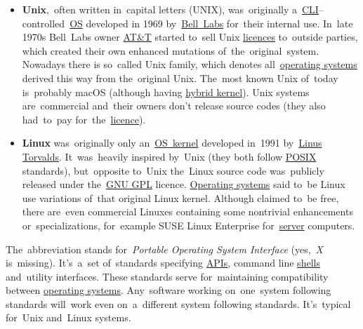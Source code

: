 \label{linux}

\label{unixlinux}
\begin{itemize}
    \item \textbf{Unix},~often written in~capital letters (UNIX), was~originally a~\hyperref[shellcligui]{CLI}--controlled~\hyperref[os]{OS} developed in 1969 by~\href{https://en.wikipedia.org/wiki/Bell_Labs}{Bell~Labs} for~their internal use.
          In~late 1970s Bell~Labs owner \href{https://en.wikipedia.org/wiki/AT\%26T}{AT\&T} started to~sell Unix \hyperref[licencing]{licences} to~outside parties, which created their own enhanced mutations of~the~original~system.
          Nowadays there is so~called Unix family, which denotes all~\hyperref[os]{operating systems} derived this way from the~original Unix.
          The~most known Unix of~today is~probably macOS (although having \hyperref[hybridkernel]{hybrid kernel}).
          \warningnonl Unix systems are~commercial and~their owners don't release source codes (they also had~to~pay for~the~\hyperref[licencing]{licence}).
    \item \textbf{Linux} was~originally only an~\hyperref[kernel]{OS~kernel} developed in~1991 by~\href{https://en.wikipedia.org/wiki/Linus_Torvalds}{Linus Torvalds}.
          It~was~heavily inspired by~Unix (they both follow \hyperref[posix]{POSIX} standards), but~opposite to~Unix the~Linux source code was~publicly released under the~\hyperref[gpl]{GNU GPL} licence.
          \hyperref[os]{Operating systems} said to~be Linux use variations of~that original Linux kernel.
          Although claimed to~be free, there are~even commercial Linuxes containing some nontrivial enhancements or~specializations, for~example SUSE Linux Enterprise for~\hyperref[server]{server} computers.
\end{itemize}

\label{posix}
The~abbreviation stands for~\textit{Portable Operating System Interface} (yes,~\textit{X} is~missing).
It's~a~set of~standards specifying \hyperref[api]{APIs}, command line \hyperref[shellcligui]{shells} and~utility interfaces.
These standards serve for~maintaining compatibility between \hyperref[os]{operating systems}.
Any~software working on~one~system following standards will~work even on~a~different system following standards.
It's~typical for~Unix and~Linux systems.
\newpage

